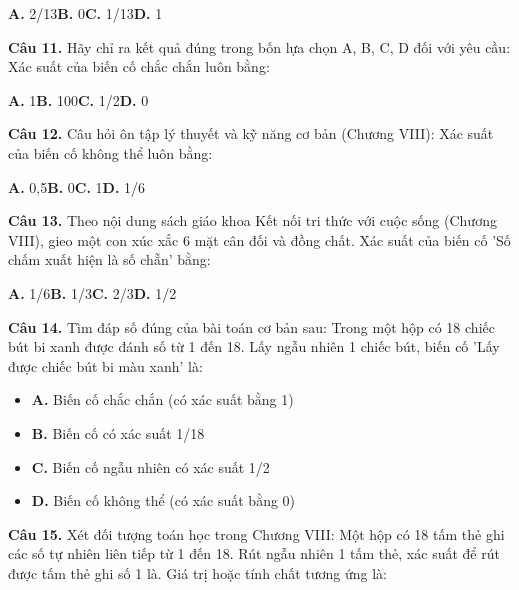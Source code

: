 \documentclass[11pt,a4paper]{article}
\begin{document}
\hspace*{1.5em}\textbf{A.} 2/13\quad\quad \textbf{B.} 0\quad\quad \textbf{C.} 1/13\quad\quad \textbf{D.} 1\par\vspace{2pt}
\textbf{\color{primary} Câu 11.} Hãy chỉ ra kết quả đúng trong bốn lựa chọn A, B, C, D đối với yêu cầu: Xác suất của biến cố chắc chắn luôn bằng:\par
\hspace*{1.5em}\textbf{A.} 1\quad\quad \textbf{B.} 100\quad\quad \textbf{C.} 1/2\quad\quad \textbf{D.} 0\par\vspace{2pt}
\textbf{\color{primary} Câu 12.} Câu hỏi ôn tập lý thuyết và kỹ năng cơ bản (Chương VIII): Xác suất của biến cố không thể luôn bằng:\par
\hspace*{1.5em}\textbf{A.} 0,5\quad\quad \textbf{B.} 0\quad\quad \textbf{C.} 1\quad\quad \textbf{D.} 1/6\par\vspace{2pt}
\textbf{\color{primary} Câu 13.} Theo nội dung sách giáo khoa Kết nối tri thức với cuộc sống (Chương VIII), gieo một con xúc xắc 6 mặt cân đối và đồng chất. Xác suất của biến cố 'Số chấm xuất hiện là số chẵn' bằng:\par
\hspace*{1.5em}\textbf{A.} 1/6\quad\quad \textbf{B.} 1/3\quad\quad \textbf{C.} 2/3\quad\quad \textbf{D.} 1/2\par\vspace{2pt}
\textbf{\color{primary} Câu 14.} Tìm đáp số đúng của bài toán cơ bản sau: Trong một hộp có 18 chiếc bút bi xanh được đánh số từ 1 đến 18. Lấy ngẫu nhiên 1 chiếc bút, biến cố 'Lấy được chiếc bút bi màu xanh' là:\par
\begin{itemize}\setlength{\itemsep}{1pt}\setlength{\parskip}{0pt}
  \item[] \textbf{A.} Biến cố chắc chắn (có xác suất bằng 1)
  \item[] \textbf{B.} Biến cố có xác suất 1/18
  \item[] \textbf{C.} Biến cố ngẫu nhiên có xác suất 1/2
  \item[] \textbf{D.} Biến cố không thể (có xác suất bằng 0)
\end{itemize}\vspace{2pt}
\textbf{\color{primary} Câu 15.} Xét đối tượng toán học trong Chương VIII: Một hộp có 18 tấm thẻ ghi các số tự nhiên liên tiếp từ 1 đến 18. Rút ngẫu nhiên 1 tấm thẻ, xác suất để rút được tấm thẻ ghi số 1 là. Giá trị hoặc tính chất tương ứng là:\par
\end{document}
